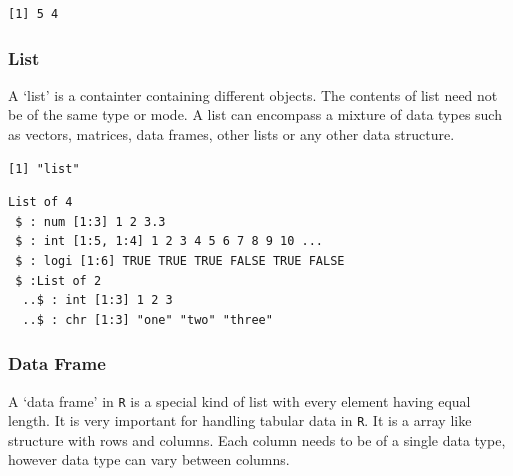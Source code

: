\begin{verbatim}
[1] 5 4
\end{verbatim}

\hypertarget{list}{%
\subsubsection{List}\label{list}}

A `list' is a containter containing different objects. The contents of
list need not be of the same type or mode. A list can encompass a
mixture of data types such as vectors, matrices, data frames, other
lists or any other data structure.

\begin{Shaded}
\begin{Highlighting}[]
\StringTok{ }
\end{Highlighting}
\end{Shaded}

\begin{verbatim}
[1] "list"
\end{verbatim}

\begin{Shaded}
\begin{Highlighting}[]
\end{Highlighting}
\end{Shaded}

\begin{verbatim}
List of 4
 $ : num [1:3] 1 2 3.3
 $ : int [1:5, 1:4] 1 2 3 4 5 6 7 8 9 10 ...
 $ : logi [1:6] TRUE TRUE TRUE FALSE TRUE FALSE
 $ :List of 2
  ..$ : int [1:3] 1 2 3
  ..$ : chr [1:3] "one" "two" "three"
\end{verbatim}

\hypertarget{dataframe}{%
\subsubsection{Data Frame}\label{dataframe}}

A `data frame' in \texttt{R} is a special kind of list with every
element having equal length. It is very important for handling tabular
data in \texttt{R}. It is a array like structure with rows and columns.
Each column needs to be of a single data type, however data type can
vary between columns.

\begin{Shaded}
\begin{Highlighting}[]
\StringTok{ }\NormalTok{LETTERS[}\OperatorTok{:}\NormalTok{]}
\StringTok{ }\OperatorTok{:}
\StringTok{ }\NormalTok{(}\NormalTok{, }\NormalTok{, }\NormalTok{, }\NormalTok{)}
\StringTok{ } 
\end{Highlighting}
\end{Shaded}

